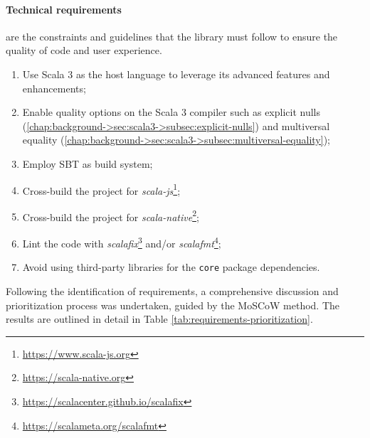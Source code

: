 \paragraph{Technical requirements} are the constraints and guidelines that the library must follow to ensure the quality of code and user experience.
\begin{enumerate}[label=\textbf{T.\arabic*}]
    \item Use Scala 3 as the host language to leverage its advanced features and enhancements;
    \item Enable quality options on the Scala 3 compiler such as explicit nulls (\cref{chap:background->sec:scala3->subsec:explicit-nulls}) and multiversal equality (\cref{chap:background->sec:scala3->subsec:multiversal-equality});
    \item Employ \ac{SBT} as build system;
    \item Cross-build the project for \textit{scala-js}\footnote{\url{https://www.scala-js.org}};
    \item Cross-build the project for \textit{scala-native}\footnote{\url{https://scala-native.org}};
    \item Lint the code with \textit{scalafix}\footnote{\url{https://scalacenter.github.io/scalafix}} and/or \textit{scalafmt}\footnote{\url{https://scalameta.org/scalafmt}};
    \item Avoid using third-party libraries for the \texttt{core} package dependencies.
\end{enumerate}

Following the identification of requirements, a comprehensive discussion and prioritization process was undertaken, guided by the \ac{MoSCoW} method.
%
The results are outlined in detail in Table \ref{tab:requirements-prioritization}.

